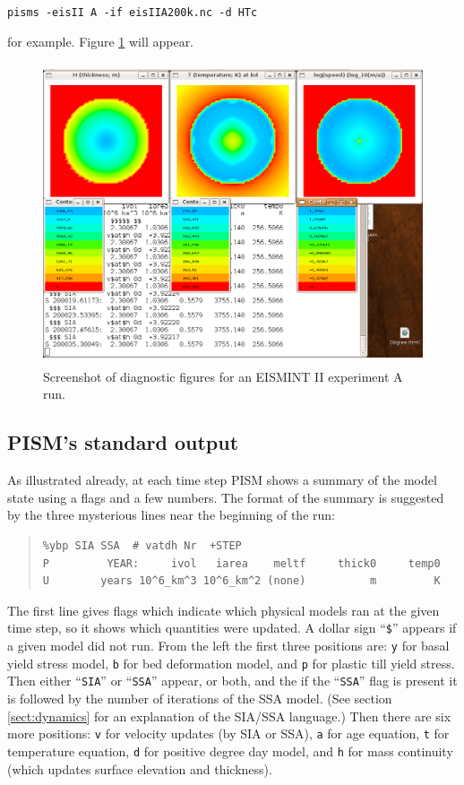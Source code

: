 \documentclass[11pt,final]{amsart}
\renewcommand{\t}[1]{\texttt{#1}}
\begin{document}
\verb|pisms -eisII A -if eisIIA200k.nc -d HTc|

\noindent for example.  Figure \ref{fig:screenshot} will appear.

\begin{figure}[ht]
\includegraphics[height=3.5in,keepaspectratio=true]{figs/eisIIAshot}
\caption{Screenshot of diagnostic figures for an EISMINT II experiment A run.}
\label{fig:screenshot}
\end{figure}

\subsection{PISM's standard output}   As illustrated already, at each time step PISM shows a summary of the model state using a flags and a few numbers.  The format of the summary is suggested by the three mysterious lines near the beginning of the run:

\small\begin{quote}\begin{verbatim}
%ybp SIA SSA  # vatdh Nr  +STEP
P         YEAR:     ivol   iarea    meltf     thick0     temp0
U        years 10^6_km^3 10^6_km^2 (none)          m         K
\end{verbatim}
\end{quote}\normalsize

\noindent The first line gives flags which indicate which physical models ran at the given time step, so it shows which quantities were updated.  A dollar sign ``\t{\$}'' appears if a given model did not run.  From the left the first three positions are: \t{y} for basal yield stress model, \t{b} for bed deformation model, and \t{p} for plastic till yield stress.  Then either ``\verb|SIA|'' or ``\verb|SSA|'' appear, or both, and the if the ``\verb|SSA|'' flag is present it is followed by the number of iterations of the SSA model.  (See section \ref{sect:dynamics} for an explanation of the SIA/SSA language.)  Then there are six more positions: \t{v} for velocity updates (by SIA or SSA), \t{a} for age equation, \t{t} for temperature equation, \t{d} for positive degree day model, and \t{h} for mass continuity (which updates surface elevation and thickness).  
\end{document}
